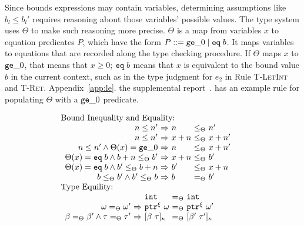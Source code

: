 Since bounds expressions may
contain variables, determining assumptions like $b_l \leq b_l'$
requires reasoning about those variables' possible values. The type
system uses $\Theta$ to make such reasoning more precise.
$\Theta$ is a map from variables $x$ to
equation predicates $P$, which have the form $P ::= \texttt{ge}\_0 \;|\; \texttt{eq}\;{b}$.
It maps variables to equations that are recorded along the type checking procedure.
If $\Theta$ maps $x$ to $\texttt{ge}\_0$, that means that $x \ge 0$;
$\texttt{eq}\;{b}$ means that $x$ is equivalent to the bound value $b$ in the current context, 
such as in the type judgment for $e_2$ in Rule \textsc{T-LetInt} and \textsc{T-Ret}.
\iftr
  Appendix~\ref{app:le}.
\else
  the supplemental report~\cite{checkedc-tech-report}.
\fi has an example rule for populating $\Theta$ with a $\texttt{ge}\_0$ predicate.

\begin{DIFnomarkup}
\begin{figure}
{\small
\[\hspace*{-1.2em}
\begin{array}{l}
\text{Bound Inequality and Equality:}\\
  \begin{array}{r@{~}c@{~}l@{~}c@{~}l}
     n \le n' &\Rightarrow& n &\le_{\Theta} & n'\\
     n \le n' &\Rightarrow& x+n &\le_{\Theta} & x+n'\\
     n \le n' \wedge \Theta(x)=\tgez &\Rightarrow& n &\le_{\Theta} & x+n'\\
     \Theta(x)=\teq{b} \wedge b+n\le_{\Theta}b'  &\Rightarrow& x+n & \le_{\Theta} & b'\\
     \Theta(x)=\teq{b}\wedge b'\le_{\Theta}b+n  &\Rightarrow& b' & \le_{\Theta} & x+n\\
     b \le_{\Theta} b' \wedge b' \le_{\Theta} b  &\Rightarrow& b & =_{\Theta} & b'
    \end{array}
  \\[0.5em]
\text{Type Equility:}\\
  \begin{array}{r@{~}c@{~}l@{~}c@{~}l}
     && \tint & =_{\Theta} & \tint\\
     \omega =_{\Theta} \omega' &\Rightarrow& \tptr{\omega}{\xi} & =_{\Theta} & \tptr{\omega'}{\xi}\\
     \bvar =_{\Theta} \bvar' \wedge  \tau =_{\Theta} \tau'
             &\Rightarrow& \tallarrayb{\bvar}{\tau} & =_{\Theta} & \tallarrayb{\bvar'}{\tau'}\\


\end{array}
\end{array}\]}
\end{figure}
\end{DIFnomarkup}
